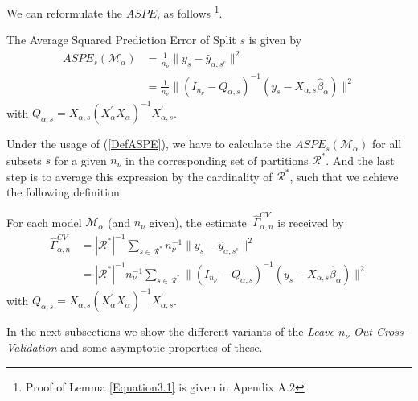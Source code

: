 \documentclass[Research_Module_ES.tex]{subfiles}
\begin{document}
We can reformulate the $ASPE$, as follows \footnote{Proof of Lemma \ref{Equation3.1} is given in Apendix A.2}.
\begin{lemma}
	\label{Equation3.1}
	The Average Squared Prediction Error of Split $s$ is given by
	\begin{align}
		ASPE_{s}(\mathcal{M}_\alpha)&=\frac{1}{n_\nu}\parallel y_s-\hat{y}_{\alpha,s^c}\parallel^2\label{DefASPE}\\\nonumber
		&=\frac{1}{n_\nu}\parallel (I_{n_\nu}-Q_{\alpha,s})^{-1}(y_s-X_{\alpha,s}\hat{\beta}_\alpha)\parallel^2
	\end{align}
	with $Q_{\alpha,s}=X_{\alpha,s}(X_\alpha^\prime X_\alpha)^{-1}X_{\alpha,s}^\prime$.
\end{lemma}
Under the usage of (\ref{DefASPE}), we have to calculate the $ASPE_{s}(\mathcal{M}_\alpha)$ for all subsets $s$  for a given $n_\nu$ in the corresponding set of partitions $\mathcal{R}^\ast$. And the last step is to average this expression by the cardinality of $\mathcal{R}^\ast$, such that we achieve the following definition.
\begin{defi}
	\label{estimator CV(n_v)}
	For each model $\mathcal{M}_\alpha$ (and $n_\nu$ given), the estimate $~\hat{\Gamma}_{\alpha,n}^{CV}$ is received by
	\begin{align*}
		\hat{\Gamma}_{\alpha,n}^{CV}&=|\mathcal{R}^\ast|^{-1}\sum_{s\in \mathcal{R}^\ast}n_\nu^{-1}\parallel y_s-\hat{y}_{\alpha,s^c}\parallel^2\\
		&=|\mathcal{R}^\ast|^{-1}n_\nu^{-1}\sum_{s\in \mathcal{R}^\ast}\parallel (I_{n_\nu}-Q_{\alpha,s})^{-1}(y_s-X_{\alpha,s}\hat{\beta}_\alpha)\parallel^2
	\end{align*}	
	with $Q_{\alpha,s}=X_{\alpha,s}(X_\alpha^\prime X_\alpha)^{-1}X_{\alpha,s}^\prime$.
\end{defi}
In the next subsections we show the different variants of the \textit{Leave-$n_\nu$-Out Cross-Validation} and some asymptotic properties of these.

	






\end{document}
